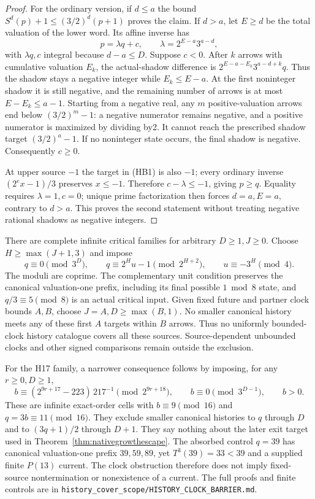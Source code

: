 \documentclass[11pt]{article}
\begin{document}
\begin{proof}
For the ordinary version, if $d\le a$ the bound
$S^d(p)+1\le(3/2)^d(p+1)$ proves the claim.
If $d>a$, let $E\ge d$ be the total valuation of the lower word.
Its affine inverse has
\[
 p=\lambda q+c,\qquad
 \lambda=2^{E-a}3^{a-d},
 \tag{HB4}
\]
with $\lambda q,c$ integral because $d-a\le D$.
Suppose $c<0$. After $k$ arrows with cumulative valuation $E_k$,
the actual-shadow difference is
$2^{E-a-E_k}3^{a-d+k}q$. Thus the shadow stays a negative
integer while $E_k\le E-a$. At the first noninteger shadow
it is still negative, and the remaining number of arrows is at most
$E-E_k\le a-1$. Starting from a negative real, any $m$ positive-valuation
arrows end below $(3/2)^m-1$: a negative numerator remains negative,
and a positive numerator is maximized by dividing by2.
It cannot reach the prescribed shadow target $(3/2)^a-1$.
If no noninteger state occurs, the final shadow is negative.
Consequently $c\ge0$.

At upper source $-1$ the target in (HB1) is also $-1$;
every ordinary inverse $(2^e x-1)/3$ preserves $x\le-1$.
Therefore $c-\lambda\le-1$, giving $p\ge q$.
Equality requires $\lambda=1,c=0$; unique prime factorization
then forces $d=a,E=a$, contrary to $d>a$.
This proves the second statement without treating negative rational
shadows as negative integers.
\end{proof}

There are complete infinite critical families for arbitrary
$D\ge1,J\ge0$. Choose $H\ge\max(J+1,3)$ and impose
\[
 q\equiv0\pmod{3^D},\qquad
 q\equiv2^H u-1\pmod{2^{H+2}},\qquad
 u\equiv-3^H\pmod4.
 \tag{HB5}
\]
The moduli are coprime. The complementary unit condition preserves
the canonical valuation-one prefix, including its final possible
$1\bmod8$ state, and $q/3\equiv5\pmod8$ is an actual critical input.
Given fixed future and partner clock bounds $A,B$, choose
$J=A,D\ge\max(B,1)$. No smaller canonical history meets any of
these first $A$ targets within $B$ arrows. Thus no uniformly
bounded-clock history catalogue covers all these sources.
Source-dependent unbounded clocks and other signed comparisons
remain outside the exclusion.

For the H17 family, a narrower consequence follows by imposing,
for any $r\ge0,D\ge1$,
\[
 b\equiv(2^{9r+17}-223)\,217^{-1}\pmod{2^{9r+18}},
 \qquad b\equiv0\pmod{3^{D-1}},\qquad b>0.
 \tag{HB6}
\]
These are infinite exact-order cells with $b\equiv9\pmod{16}$
and $q=3b\equiv11\pmod{16}$. They exclude smaller canonical
histories to $q$ through $D$ and to $(3q+1)/2$ through $D+1$.
They say nothing about the later exit target used in
Theorem~\ref{thm:nativegrowthescape}.
The absorbed control $q=39$ has canonical valuation-one prefix
$39,59,89$, yet $T^3(39)=33<39$ and a supplied finite $P(13)$
current. The clock obstruction therefore does not imply fixed-source
nontermination or nonexistence of a current. The full proofs and
finite controls are in
\texttt{history\_cover\_scope/HISTORY\_CLOCK\_BARRIER.md}.
\end{document}
